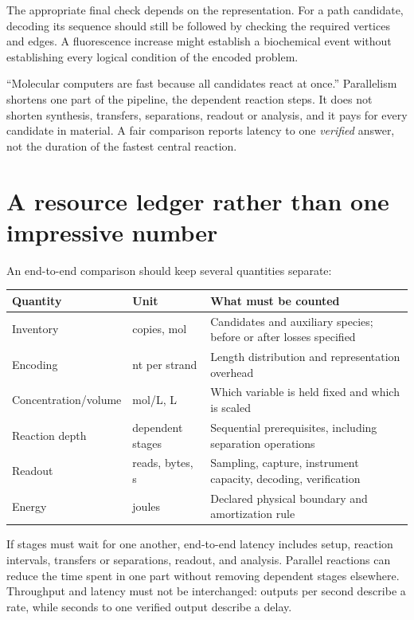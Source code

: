 The appropriate final check depends on the representation. For a path candidate, decoding its sequence should still be followed by checking the required vertices and edges. A fluorescence increase might establish a biochemical event without establishing every logical condition of the encoded problem.

\begin{Pitfall}
``Molecular computers are fast because all candidates react at once.''
Parallelism shortens one part of the pipeline, the dependent reaction steps. It
does not shorten synthesis, transfers, separations, readout or analysis, and it
pays for every candidate in material. A fair comparison reports latency to one
\emph{verified} answer, not the duration of the fastest central reaction.
\end{Pitfall}

\section{A resource ledger rather than one impressive number}\label{sec:ledger}

An end-to-end comparison should keep several quantities separate:

\begin{center}\small
\begin{tabular}{p{.22\linewidth}p{.22\linewidth}p{.46\linewidth}}
\toprule Quantity & Unit & What must be counted\\\midrule
Inventory & copies, mol & Candidates and auxiliary species; before or after losses specified\\
Encoding & nt per strand & Length distribution and representation overhead\\
Concentration/volume & mol/L, L & Which variable is held fixed and which is scaled\\
Reaction depth & dependent stages & Sequential prerequisites, including separation operations\\
Readout & reads, bytes, s & Sampling, capture, instrument capacity, decoding, verification\\
Energy & joules & Declared physical boundary and amortization rule\\\bottomrule
\end{tabular}
\end{center}

If stages must wait for one another, end-to-end latency includes setup, reaction intervals, transfers or separations, readout, and analysis. Parallel reactions can reduce the time spent in one part without removing dependent stages elsewhere. Throughput and latency must not be interchanged: outputs per second describe a rate, while seconds to one verified output describe a delay.

